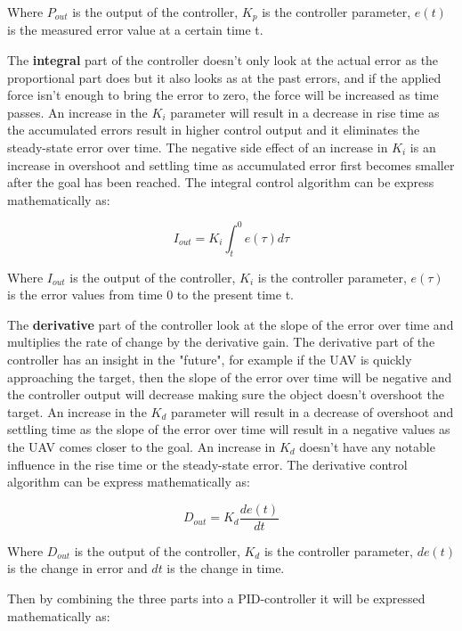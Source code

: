 \documentclass[conference]{IEEEtran}
\begin{document}
Where $P_{out}$ is the output of the controller, $K_p$ is the controller parameter, $e(t)$ is the measured error value at a certain time t. 

The \textbf{integral} part of the controller doesn't only look at the actual error as the proportional part does but it also looks as at the past errors, and if the applied force isn't enough to bring the error to zero, the force will be increased as time passes. An increase in the $K_i$ parameter will result in a decrease in rise time as the accumulated errors result in higher control output and it eliminates the steady-state error over time. The negative side effect of an increase in $K_i$ is an increase in overshoot and settling time as accumulated error first becomes smaller after the goal has been reached. The integral control algorithm can be express mathematically as:

\begin{equation}
I_{out} = K_i \int_{t}^{0}  e(\tau) d\tau \label{eq2}
\end{equation}

Where $I_{out}$ is the output of the controller, $K_i$ is the controller parameter, $e(\tau)$ is the error values from time 0 to the present time t. 

The \textbf{derivative} part of the controller look at the slope of the error over time and multiplies the rate of change by the derivative gain. The derivative part of the controller has an insight in the "future", for example if the UAV is quickly approaching the target, then the slope of the error over time will be negative and the controller output will decrease making sure the object doesn't overshoot the target. An increase in the $K_d$ parameter will result in a decrease of overshoot and settling time as the slope of the error over time will result in a negative values as the UAV comes closer to the goal. An increase in $K_d$ doesn't have any notable influence in the rise time or the steady-state error. The derivative control algorithm can be express mathematically as:

\begin{equation}
D_{out} = K_d \frac{de(t)}{dt} \label{eq3}
\end{equation}

Where $D_{out}$ is the output of the controller, $K_d$ is the controller parameter, $de(t)$ is the change in error and $dt$ is the change in time.

Then by combining the three parts into a PID-controller it will be expressed mathematically as:
 
\end{document}
